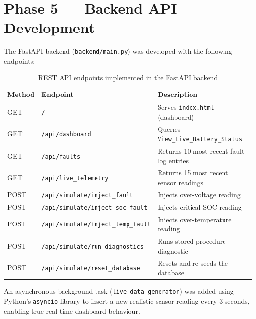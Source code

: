 \documentclass[12pt, a4paper]{report}
\begin{document}
\section{Phase 5 — Backend API Development}
The FastAPI backend (\texttt{backend/main.py}) was developed with the following endpoints:

\begin{table}[h]
    \centering
    \caption{REST API endpoints implemented in the FastAPI backend}
    \begin{tabular}{@{} l l p{6cm} @{}}
        \toprule
        \textbf{Method} & \textbf{Endpoint} & \textbf{Description} \\
        \midrule
        GET  & \texttt{/}                              & Serves \texttt{index.html} (dashboard) \\
        GET  & \texttt{/api/dashboard}                  & Queries \texttt{View\_Live\_Battery\_Status} \\
        GET  & \texttt{/api/faults}                     & Returns 10 most recent fault log entries \\
        GET  & \texttt{/api/live\_telemetry}             & Returns 15 most recent sensor readings \\
        POST & \texttt{/api/simulate/inject\_fault}      & Injects over-voltage reading \\
        POST & \texttt{/api/simulate/inject\_soc\_fault} & Injects critical SOC reading \\
        POST & \texttt{/api/simulate/inject\_temp\_fault}& Injects over-temperature reading \\
        POST & \texttt{/api/simulate/run\_diagnostics}  & Runs stored-procedure diagnostic \\
        POST & \texttt{/api/simulate/reset\_database}   & Resets and re-seeds the database \\
        \bottomrule
    \end{tabular}
    \label{tab:endpoints}
\end{table}

An asynchronous background task (\texttt{live\_data\_generator}) was added using Python's \texttt{asyncio} library to insert a new realistic sensor reading every 3 seconds, enabling true real-time dashboard behaviour.
\end{document}
